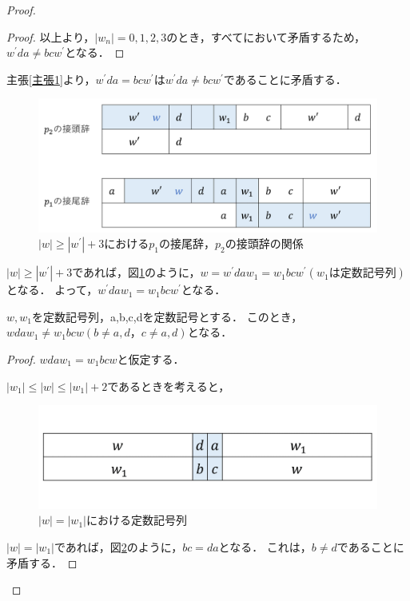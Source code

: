 \begin{proof}
\begin{proof}
以上より，$|w_{n}|=0,1,2,3$のとき，すべてにおいて矛盾するため，$w^{\prime}da \not = bcw^{\prime}$となる．
\end{proof}
主張\ref{主張1}より，$w^{\prime}da=bcw^{\prime}$は$w^{\prime}da \not =bcw^{\prime}$であることに矛盾する．

\begin{figure}[H]
\includegraphics[width=\linewidth]{画像/追加部分6.png}
\caption{\scriptsize $|w| \ge |w^{\prime}|+3$における$p_{1}$の接尾辞，$p_{2}$の接頭辞の関係}
\label{追加部分6}
\end{figure}

$|w| \ge |w^{\prime}|+3$であれば，図\ref{追加部分6}のように，$w=w^{\prime}daw_{1}=w_{1}bcw^{\prime} (w_{1}は定数記号列)$となる．
よって，$w^{\prime}daw_{1}=w_{1}bcw^{\prime}$となる．

\begin{cl}\label{主張2}
$w, w_{1}$を定数記号列，a,b,c,dを定数記号とする．
このとき，$wdaw_{1} \not =w_{1}bcw (b \not = a,d，c \not = a,d)$となる．
\end{cl}
\begin{proof}
$wdaw_{1}=w_{1}bcw$と仮定する．

$|w_{1}| \le |w| \le |w_{1}|+2$であるときを考えると，

\begin{figure}[H]
\includegraphics[width=\linewidth]{画像/追加部分7.png}
\caption{$|w| = |w_{1}|$における定数記号列}
\label{追加部分7}
\end{figure}

$|w|=|w_{1}|$であれば，図\ref{追加部分7}のように，$bc=da$となる．
これは，$b \not = d$であることに矛盾する．


\end{proof}
\end{proof}
